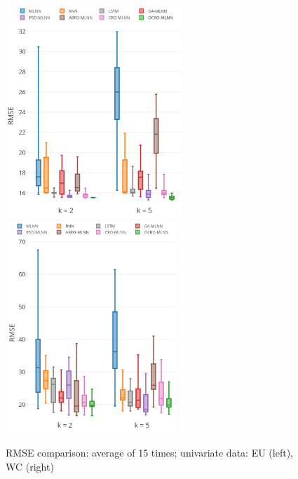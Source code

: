\documentclass[smallcondensed, natbib]{svjour3}     %
\begin{document}
{\begin{figure}
	\centering
	\begin{minipage}[t]{1\textwidth}
		\centering
		\includegraphics[width=0.45\textwidth =0cm 0cm 0cm 0cm, height = 8cm]{stability/st_eu_2.pdf}
		\centering
		\includegraphics[width=0.45\textwidth =0cm 0cm 0cm 0cm, height = 8cm]{stability/st_wc_2.pdf}
	\end{minipage}
	\caption{RMSE comparison: average of 15 times; univariate data: EU (left), WC (right)} 
	\label{fig:stability_uni}
\end{figure}

}
\end{document}
